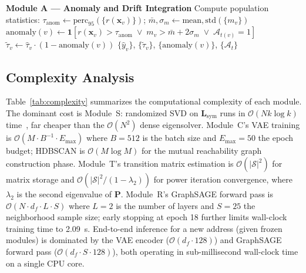 \documentclass[journal]{IEEEtran}
\begin{document}
\begin{algorithm}[t]
\begin{algorithmic}[1]
\Statex
\Statex \textbf{Module A — Anomaly and Drift Integration}
\State Compute population statistics:
       $\tau_{\mathrm{anom}} \leftarrow \mathrm{perc}_{95}(\{r(\mathbf{x}_v)\})$;\quad
       $\bar{m}, \sigma_m \leftarrow \mathrm{mean}, \mathrm{std}(\{m_v\})$
    \State $\mathrm{anomaly}(v) \leftarrow
            \mathbf{1}\!\left[
              r(\mathbf{x}_v) > \tau_{\mathrm{anom}}
              \;\lor\;
              m_v > \bar{m} + 2\sigma_m
              \;\lor\;
              \mathcal{A}_{t(v)} = 1
            \right]$
    \State $\tilde{\tau}_v \leftarrow \hat{\tau}_v \cdot
            (1 - \mathrm{anomaly}(v))$
\EndFor
\State \Return $\{\hat{y}_v\}$, $\{\tilde{\tau}_v\}$,
               $\{\mathrm{anomaly}(v)\}$, $\{\mathcal{A}_t\}$
\end{algorithmic}
\end{algorithm}

\subsection{Complexity Analysis}
\label{sec:complexity}

Table~\ref{tab:complexity} summarizes the computational complexity of each
module.
The dominant cost is Module~S: randomized SVD on $\mathbf{L}_{\mathrm{sym}}$
runs in $\mathcal{O}(N k \log k)$ time~\cite{Halko2011}, far cheaper
than the $\mathcal{O}(N^2)$ dense eigensolver.
Module~C's VAE training is $\mathcal{O}(M \cdot B^{-1} \cdot E_{\max})$
where $B = 512$ is the batch size and $E_{\max} = 50$ the epoch budget;
HDBSCAN is $\mathcal{O}(M \log M)$ for the mutual reachability graph
construction phase.
Module~T's transition matrix estimation is $\mathcal{O}(|\mathcal{S}|^2)$
for matrix storage and $\mathcal{O}(|\mathcal{S}|^2 / (1-\lambda_2))$ for
power iteration convergence, where $\lambda_2$ is the second eigenvalue of
$\mathbf{P}$.
Module~R's GraphSAGE forward pass is $\mathcal{O}(N \cdot d_f \cdot L \cdot S)$
where $L = 2$ is the number of layers and $S = 25$ the neighborhood sample
size; early stopping at epoch 18 further limits wall-clock training time to
\SI{2.09}{\second}.
End-to-end inference for a new address (given frozen modules) is dominated by
the VAE encoder ($\mathcal{O}(d_f \cdot 128)$) and GraphSAGE forward pass
($\mathcal{O}(d_f \cdot S \cdot 128)$), both operating in sub-millisecond
wall-clock time on a single CPU core.
\end{document}
